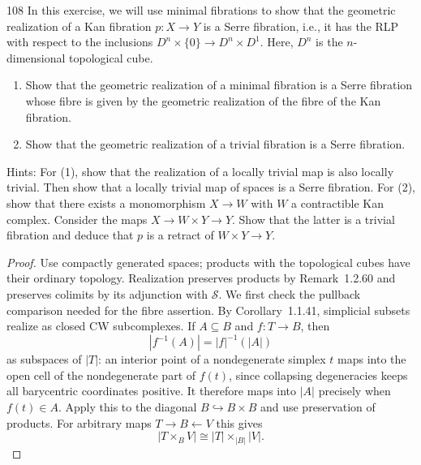 \begin{exercise}{108}
In this exercise, we will use minimal fibrations to show that the geometric
realization of a Kan fibration $p\colon X\to Y$ is a Serre fibration, i.e., it has the RLP
with respect to the inclusions $D^n\times\{0\}\to D^n\times D^1$. Here, $D^n$ is the
$n$-dimensional topological cube.
\begin{enumerate}[label=(\arabic*)]
 \item Show that the geometric realization of a minimal fibration is a Serre fibration whose fibre
       is given by the geometric realization of the fibre of the Kan fibration.
 \item Show that the geometric realization of a trivial fibration is a Serre fibration.
\end{enumerate}
Hints: For (1), show that the realization of a locally trivial map is also locally trivial. Then
show that a locally trivial map of spaces is a Serre fibration. For (2), show that there exists
a monomorphism $X\to W$ with $W$ a contractible Kan complex. Consider the maps
$X\to W\times Y\to Y$. Show that the latter is a trivial fibration and deduce that $p$ is a
retract of $W\times Y\to Y$.

\begin{proof}
Use compactly generated spaces; products with the topological cubes have
their ordinary topology. Realization preserves products by
Remark~1.2.60 and preserves colimits by its adjunction with $\mathcal S$.
We first check the pullback comparison needed for the fibre assertion.
By Corollary~1.1.41, simplicial subsets realize as closed CW subcomplexes.
If $A\subseteq B$ and $f\colon T\to B$, then
\[
 |f^{-1}(A)|=|f|^{-1}(|A|)
\]
as subspaces of $|T|$: an interior point of a nondegenerate simplex
$t$ maps into the open cell of the nondegenerate part of $f(t)$,
since collapsing degeneracies keeps all barycentric coordinates positive.
It therefore maps into $|A|$ precisely when $f(t)\in A$.
Apply this to the diagonal $B\hookrightarrow B\times B$ and use
preservation of products. For arbitrary maps $T\to B\leftarrow V$ this gives
\[
 |T\times_B V|\cong |T|\times_{|B|}|V|.
\]


\end{proof}
\end{exercise}

